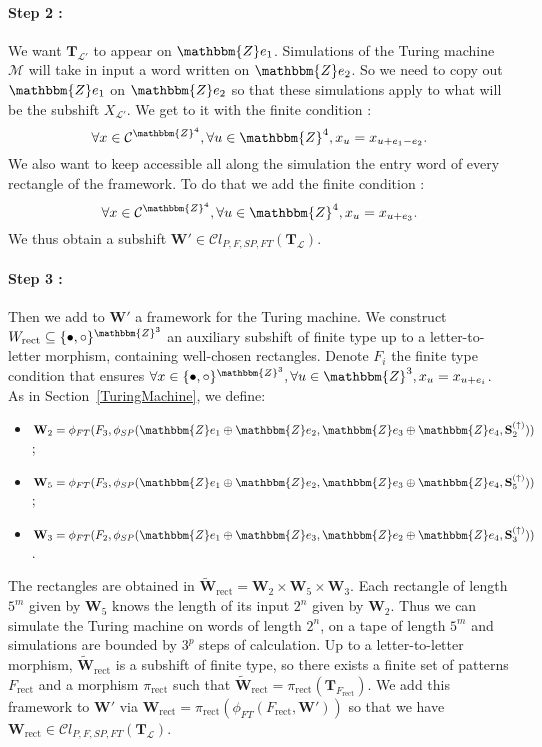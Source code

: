 \documentclass[proceedings]{stacs}
\theoremstyle{plain}\newtheorem{satz}[thm]{Satz}
\theoremstyle{definition}\newtheorem{crucial}[thm]{Crucial Definition}
\newcommand{\Z}{\mathbbm{Z}}
\newcommand{\T}{\mathbf{T}}
\newcommand{\Sub}{\mathbf{S}}
\newcommand{\W}{\mathbf{W}}
\newcommand{\TM}{\mathcal{M}}
\newcommand{\Lang}{\mathcal{L}}
\begin{document}
\paragraph{Step 2 :} We want $\T_{\Lang'}$ to appear on $\mathbbm{Z}e_1$. Simulations of the Turing machine $\TM$ will take in input a word written on $\mathbbm{Z}e_2$. So we need to copy out $\mathbbm{Z}e_1$ on $\mathbbm{Z}e_2$ so that these simulations apply to what will be the subshift $X_{\Lang'}$. We get to it with the finite condition :
$$\forall x\in \mathcal{C}^{\mathbbm{Z}^4}, \forall u\in\mathbbm{Z}^4, x_u=x_{u+e_1-e_2}.$$
We also want to keep accessible all along the simulation the entry word of every rectangle of the framework. To do that we add the finite condition :
$$\forall x\in \mathcal{C}^{\mathbbm{Z}^4}, \forall u\in\mathbbm{Z}^4, x_u=x_{u+e_3}.$$
We thus obtain a subshift $\W'\in\mathcal{C}l_{P,F,SP,FT}(\T_\Lang)$.
\paragraph{Step 3 :} Then we add to $\W'$ a framework for the Turing machine. We construct $W_{\textrm{rect}}\subseteq\{\bullet,\circ \}^{\Z^3}$ an auxiliary subshift of finite type up to a letter-to-letter morphism, containing well-chosen rectangles. Denote $F_i$ the finite type condition that ensures $\forall x\in\{\bullet,\circ \}^{\Z^3} , \forall u\in\mathbbm{Z}^3, x_u=x_{u+e_i}$. As in Section~\ref{TuringMachine}, we define:
\begin{itemize}
\item  $\W_2=\phi_{FT}(F_3, \phi_{SP}(\Z e_1\oplus\Z e_2,\Z e_3\oplus\Z e_4, \Sub_2^{(\uparrow)}))$;
\item  $\W_5=\phi_{FT}(F_3, \phi_{SP}(\Z e_1\oplus\Z e_2,\Z e_3\oplus\Z e_4, \Sub_5^{(\uparrow)}))$;
\item  $\W_3=\phi_{FT}(F_2,\phi_{SP}(\Z e_1\oplus\Z e_3,\Z e_2\oplus\Z e_4,\Sub_3^{(\uparrow)}) )$.
\end{itemize}

The rectangles are obtained in $\tilde{\W}_{\textrm{rect}}=\W_2\times \W_5\times \W_3$. Each rectangle of length $5^m$ given by $\W_5$ knows the length of its input $2^n$ given by $\W_2$. Thus we can simulate the Turing machine on words of length $2^n$, on a tape of length $5^m$ and simulations are bounded by $3^p$ steps of calculation. Up to a letter-to-letter morphism, $\tilde{\W}_{\textrm{rect}}$ is a subshift of finite type, so there exists a finite set of patterns $F_{\textrm{rect}}$ and a morphism $\pi_{\textrm{rect}}$ such that $\tilde{\W}_{\textrm{rect}}=\pi_{\textrm{rect}}(\T_{F_{\textrm{rect}}})$. We add this framework to $\W'$ via $\W_{\textrm{rect}}=\pi_{\textrm{rect}}(\phi_{FT}(F_{\textrm{rect}},\W'))$ so that we have $\W_{\textrm{rect}} \in\mathcal{C}l_{P,F,SP,FT}(\T_\Lang)$.
\end{document}
